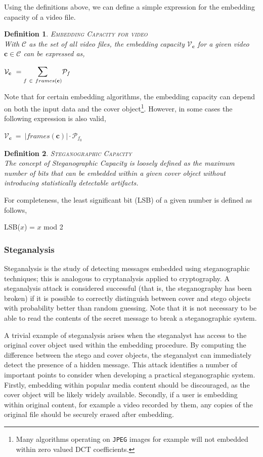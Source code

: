 \documentclass[paper=a4, fontsize=11pt,twoside]{scrartcl}    %
\numberwithin{table}{section}
\numberwithin{figure}{section}
\newtheorem{ddef}{Definition}[section]
\begin{document}
Using the definitions above, we can define a simple expression for the embedding capacity of a video file. 
\begin{ddef}
\textsc{Embedding Capacity for video}\\[5pt]
With $\mathcal{C}$ as the set of all video files, the embedding capacity $\mathcal{V} _{\textbf{c}}$ for a given video $\textbf{c} \in \mathcal{C}$ can be expressed as,
\begin{center}
	$\mathcal{V} _{\textbf{c}} ~= \mathlarger{\mathlarger{\sum}}\limits_{f ~\in ~frames(\textbf{c})} \mathcal{P} _{f}$
\end{center}
\end{ddef}
\noindent
Note that for certain embedding algorithms, the embedding capacity can depend on both the input data and the cover object\footnote{Many algorithms operating on \texttt{JPEG} images for example will not embedded within zero valued DCT coefficients.}. However, in some cases the following expression is also valid,
\begin{center}
	$\mathcal{V} _{\textbf{c}} ~=~ |frames(\textbf{c})| \cdot \mathcal{P} _{f _{0}}$
\end{center}

\begin{ddef}
\textsc{Steganographic Capacity}\\[5pt]
The concept of Steganographic Capacity is loosely defined as the maximum number of bits that can be embedded within a given cover object without introducing statistically detectable artifacts. %
\end{ddef}
\noindent
For completeness, the least significant bit (LSB) of a given number is defined as follows,
\begin{center}
	LSB($x$) = $x$ mod 2
\end{center}
\subsubsection{Steganalysis}
Steganalysis is the study of detecting messages embedded using steganographic techniques; this is analogous to cryptanalysis applied to cryptography. A steganalysis attack is considered successful (that is, the steganography has been broken) if it is possible to correctly distinguish between cover and stego objects with probability better than random guessing. Note that it is not necessary to be able to read the contents of the secret message to break a steganographic system.

A trivial example of steganalysis arises when the steganalyst has access to the original cover object used within the embedding procedure. By computing the difference between the stego and cover objects, the steganalyst can immediately detect the presence of a hidden message. This attack identifies a number of important points to consider when developing a practical steganographic system. Firstly, embedding within popular media content should be discouraged, as the cover object will be likely widely available. Secondly, if a user is embedding within original content, for example a video recorded by them, any copies of the original file should be securely erased after embedding.
\end{document}
